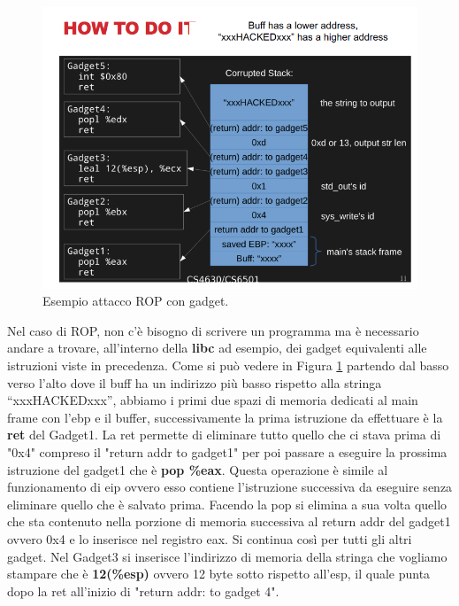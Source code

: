 \begin{figure}[H]
    \centering
    \includegraphics[width=13cm, keepaspectratio]{capitoli/secure_coding/img/cap_3/es_attacco_rop_gadget.png}
    \caption{Esempio attacco ROP con gadget.}\label{fig:es_attacco_rop_gadget}
\end{figure}

Nel caso di ROP, non c'è bisogno di scrivere un programma ma è necessario andare a trovare,
all'interno della \textbf{libc} ad esempio, dei gadget equivalenti alle istruzioni viste in precedenza.
Come si può vedere in Figura \ref{fig:es_attacco_rop_gadget} partendo dal basso verso l'alto dove il buff ha un indirizzo più basso rispetto
alla stringa “xxxHACKEDxxx”, abbiamo i primi due spazi di memoria dedicati al main frame con l'ebp e il buffer,
successivamente la prima istruzione da effettuare è la \textbf{ret} del Gadget1.
La ret permette di eliminare tutto quello che ci stava prima di "0x4" compreso il "return addr to gadget1" per poi passare a eseguire la prossima
istruzione del gadget1 che è \textbf{pop \%eax}.
Questa operazione è simile al funzionamento di eip ovvero esso contiene l'istruzione successiva da eseguire senza eliminare quello che è salvato prima.
Facendo la pop si elimina a sua volta quello che sta contenuto nella porzione di memoria successiva al return addr del gadget1 ovvero 0x4 e lo
inserisce nel registro eax. Si continua così per tutti gli altri gadget.
Nel Gadget3 si inserisce l'indirizzo di memoria della stringa che vogliamo stampare che è \textbf{12(\%esp)}
ovvero 12 byte sotto rispetto all'esp, il quale punta dopo la ret all'inizio di "return addr: to gadget 4".

